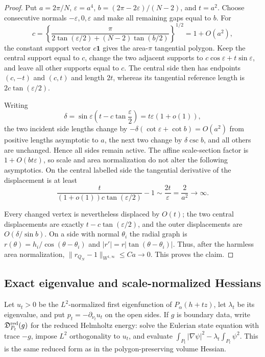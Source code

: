 \documentclass[11pt]{amsart}
\numberwithin{equation}{section}
\theoremstyle{definition}
\theoremstyle{remark}
\newcommand{\Dred}{\mathfrak D^{\rm red}}
\begin{document}
\begin{proof}
Put $a=2\pi/N$, $\varepsilon=a^4$,
$b=(2\pi-2\varepsilon)/(N-2)$, and $t=a^2$.  Choose consecutive normals
$-\varepsilon,0,\varepsilon$ and make all remaining gaps equal to $b$.
For
\[
 c=\left\{\frac{\pi}
 {2\tan(\varepsilon/2)+(N-2)\tan(b/2)}\right\}^{1/2}
 =1+O(a^2),
\]
the constant support vector $c\mathbf1$ gives the area-$\pi$ tangential
polygon.  Keep the central support equal to $c$, change the two adjacent
supports to $c\cos\varepsilon+t\sin\varepsilon$, and leave all other
supports equal to $c$.  The central side then has endpoints $(c,-t)$ and
$(c,t)$ and length $2t$, whereas its tangential reference length is
$2c\tan(\varepsilon/2)$.

Writing
\[
 \delta=\sin\varepsilon
 \left(t-c\tan\frac\varepsilon2\right)
 =t\varepsilon(1+o(1)),
\]
the two incident side lengths change by
$-\delta(\cot\varepsilon+\cot b)=O(a^2)$ from positive lengths
asymptotic to $a$, the next two change by $\delta\csc b$, and all others
are unchanged.  Hence all sides remain active.  The affine scale-section
factor is $1+O(bt\varepsilon)$, so scale and area normalization do not
alter the following asymptotics.  On the central labelled side the
tangential derivative of the displacement is at least
\[
 \frac{t}{(1+o(1))c\tan(\varepsilon/2)}-1
 \sim\frac{2t}{\varepsilon}=\frac2{a^2}\longrightarrow\infty.
\]

Every changed vertex is nevertheless displaced by $O(t)$; the two
central displacements are exactly
$t-c\tan(\varepsilon/2)$, and the outer displacements are
$O(\delta/\sin b)$.  On a side with normal $\theta_i$ the radial graph is
$r(\theta)=h_i/\cos(\theta-\theta_i)$ and
$|r'|=r|\tan(\theta-\theta_i)|$.  Thus, after the harmless area
normalization,
$\|r_{Q_N}-1\|_{W^{1,\infty}}\le Ca\to0$.  This proves the claim.
\end{proof}

\subsection{Exact eigenvalue and scale-normalized Hessians}

Let $u_t>0$ be the $L^2$-normalized first eigenfunction of
$P_\alpha(h+tz)$, let $\lambda_t$ be its eigenvalue, and put
$p_t=-\partial_{\nu_t}u_t$ on the open sides.  If $g$ is boundary data,
write $\Dred_{P_t}(g)$ for the reduced Helmholtz energy: solve the
Eulerian state equation with trace $-g$, impose $L^2$ orthogonality to
$u_t$, and evaluate
\(
 \int_{P_t}|\nabla\psi|^2-\lambda_t\int_{P_t}\psi^2.
\)
This is the same reduced form as in the polygon-preserving volume Hessian.
\end{document}
